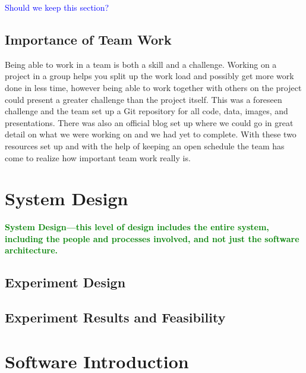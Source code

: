 \documentclass{article}
\numberwithin{equation}{section} %
\begin{document}
\textcolor{blue}{Should we keep this section?}

\subsection{Importance of Team Work}
Being able to work in a team is both a skill and a challenge. Working on a project in a group helps you split up the work load and possibly get more work done in less time, however being able to work together with others on the project could present a greater challenge than the project itself. This was a foreseen challenge and the team set up a Git repository for all code, data, images, and presentations. There was also an official blog set up where we could go in great detail on what we were working on and we had yet to complete. With these two resources set up and with the help of keeping an open schedule the team has come to realize how important team work really is.

\section{System Design}
\textcolor{green}{\bf System Design—this level of design includes the entire system, including the people and processes involved, and not just the software architecture.}

\subsection{Experiment Design}

\subsection{Experiment Results and Feasibility}

\section{Software Introduction}
\end{document}
